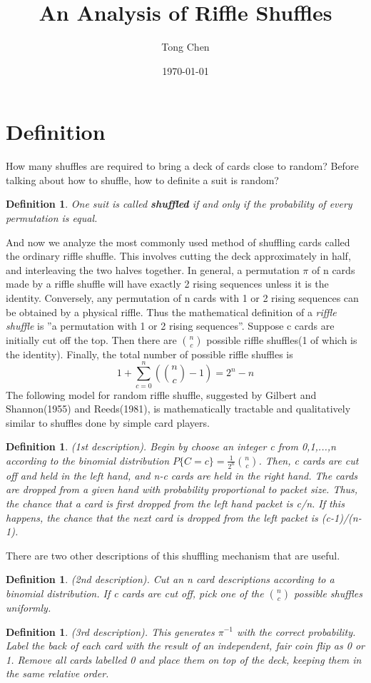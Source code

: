 \documentclass{article}
\title{An Analysis of Riffle Shuffles}
\author{Tong Chen}
\date{\today}
\newtheorem{definition}[theorem]{Definition}
\begin{document}
    \maketitle
\section{Definition}
How many shuffles are required to bring a deck of cards close to random? Before talking about how to shuffle, how to definite a suit is random?
\begin{definition}
One suit is called \textbf{shuffled} if and only if the probability of every permutation is equal.
\end{definition}
And now we analyze the most commonly used method of shuffling cards called the ordinary riffle shuffle. This involves cutting the deck approximately in half, and interleaving the two halves together.
In general, a permutation $\pi$ of n cards made by a riffle shuffle will have exactly 2 rising sequences unless it is the identity. Conversely, any permutation of n cards with 1 or 2 rising sequences can be obtained by a physical riffle. Thus the mathematical definition of a \textit{riffle shuffle} is ''a permutation with 1 or 2 rising sequences''. Suppose c cards are initially cut off the top. Then there are $n \choose c$ possible riffle shuffles(1 of which is the identity). Finally, the total number of possible riffle shuffles is
$$1+\sum_{c=0}^n ({n\choose c}-1)=2^n-n$$
The following model for random riffle shuffle, suggested by Gilbert and Shannon(1955) and Reeds(1981), is mathematically tractable and qualitatively similar to shuffles done by simple card players.
\begin{definition}
(1st description). Begin by choose an integer c from 0,1,...,n according to the binomial distribution $P\{C=c\}=\frac{1}{2^n} {n \choose c}$. Then, c cards are cut off and held in the left hand, and n-c cards are held in the right hand. The cards are dropped from a given hand with probability proportional to packet size. Thus, the chance that a card is first dropped from the left hand packet is c/n. If this happens, the chance that the next card is dropped from the left packet is (c-1)/(n-1).
\end{definition}
There are two other descriptions of this shuffling mechanism that are useful.

\begin{definition}
(2nd description). Cut an n card descriptions according to a binomial distribution. If c cards are cut off, pick one of the $n \choose c$ possible shuffles uniformly.
\end{definition}
\begin{definition}
(3rd description). This generates $\pi^{-1}$ with the correct probability. Label the back of each card with the result of an independent, fair coin flip as 0 or 1. Remove all cards labelled 0 and place them on top of the deck, keeping them in the same relative order.
\end{definition}
\end{document}
